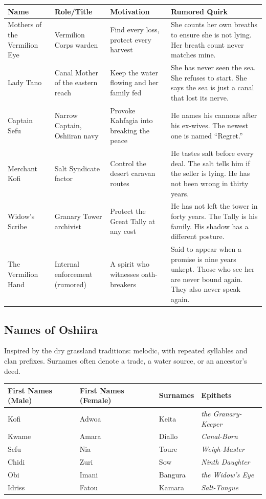 \begin{longtable}{|p{}|p{}|p{}|p{}|}
\hline
\textbf{Name} & \textbf{Role/Title} & \textbf{Motivation} & \textbf{Rumored Quirk} \\
\hline
Mothers of the Vermilion Eye & Vermilion Corps warden & Find every loss, protect every harvest & She counts her own breaths to ensure she is not lying. Her breath count never matches mine. \\
\hline
Lady Tano & Canal Mother of the eastern reach & Keep the water flowing and her family fed & She has never seen the sea. She refuses to start. She says the sea is just a canal that lost its nerve. \\
\hline
Captain Sefu & Narrow Captain, Oshiiran navy & Provoke Kahfagia into breaking the peace & He names his cannons after his ex-wives. The newest one is named ``Regret.'' \\
\hline
Merchant Kofi & Salt Syndicate factor & Control the desert caravan routes & He tastes salt before every deal. The salt tells him if the seller is lying. He has not been wrong in thirty years. \\
\hline
Widow's Scribe & Granary Tower archivist & Protect the Great Tally at any cost & He has not left the tower in forty years. The Tally is his family. His shadow has a different posture. \\
\hline
The Vermilion Hand & Internal enforcement (rumored) & A spirit who witnesses oath-breakers & Said to appear when a promise is nine years unkept. Those who see her are never bound again. They also never speak again. \\
\hline
\end{longtable}

\subsection*{Names of Oshiira}
\label{sec:oshiira-names}

Inspired by the dry grassland traditions: melodic, with repeated syllables and clan prefixes. Surnames often denote a trade, a water source, or an ancestor's deed.

\begin{longtable}{|p{}|p{}|p{}|p{}|}
\hline
\textbf{First Names (Male)} & \textbf{First Names (Female)} & \textbf{Surnames} & \textbf{Epithets} \\
\hline
Kofi & Adwoa & Keita & \textit{the Granary-Keeper} \\
\hline
Kwame & Amara & Diallo & \textit{Canal-Born} \\
\hline
Sefu & Nia & Toure & \textit{Weigh-Master} \\
\hline
Chidi & Zuri & Sow & \textit{Ninth Daughter} \\
\hline
Obi & Imani & Bangura & \textit{the Widow's Eye} \\
\hline
Idriss & Fatou & Kamara & \textit{Salt-Tongue} \\
\hline
\end{longtable}

